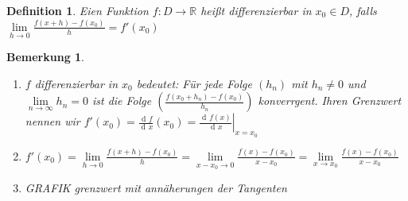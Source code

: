 \documentclass[a4paper,titlepage,oneside]{article}
\def\R{\ensuremath{\mathbb{R}} }
\newcommand{\der}{\operatorname{d\!}{}}
\renewcommand{\liminf}[2][n]{\ensuremath{\lim\limits_{#1 \rightarrow \infty}{#2}}}
\newcommand{\limnull}[2][n]{\ensuremath{\lim\limits_{#1 \rightarrow 0}{#2}}}
\newcommand{\limAB}[3][x]{\ensuremath{\lim\limits_{#1 \rightarrow #2}{#3}}}
\newcommand{\limA}[2][x_0]{\limAB{#1}{#2}}
\theoremstyle{thmstyle}
\newtheorem{defi}[satz]{Definition}
\newtheorem{bem}[satz]{Bemerkung}
\theoremstyle{subthmstyle}
\begin{document}
\begin{defi}
Eien Funktion $f : D \to \R$ heißt differenzierbar in $x_0 \in D$, falls $\limnull[h]{\frac{f(x + h) - f(x_0)}{h}} = f'(x_0)$
\end{defi}

\begin{bem}
\begin{enumerate}
\item $f$ differenzierbar in $x_0$ bedeutet:  Für jede Folge $(h_n)$ mit $h_n \ne 0$ und $\liminf{h_n} = 0$ ist die Folge $\left(\frac{f(x_0 + h_n) - f(x_0)}{h_n}\right)$ konverrgent. Ihren Grenzwert nennen wir $f'(x_0) = \frac{\der f}{\der x}(x_0) = \left.\frac{\der f(x)}{\der x}\right|_{x = x_0}$
\item $f'(x_0) = \limnull[h]{\frac{f(x + h) - f(x_0)}{h}} = \limnull[x-x_0]{\frac{f(x) - f(x_0)}{x-x_0}} = \limA{\frac{f(x) - f(x_0)}{x-x_0}}$
\item GRAFIK grenzwert mit annäherungen der Tangenten
\end{enumerate}
\end{bem}
\end{document}
